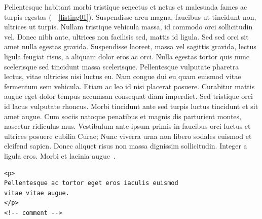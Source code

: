 Pellentesque habitant morbi tristique senectus et netus et malesuada fames ac turpis egestas (\seename\ \lstlistingname~\ref{listing01}). Suspendisse arcu magna, faucibus ut tincidunt non, ultrices ut turpis. Nullam tristique vehicula massa, id commodo orci sollicitudin vel. Donec nibh ante, ultrices non facilisis sed, mattis id ligula. Sed sed orci sit amet nulla egestas gravida. Suspendisse laoreet, massa vel sagittis gravida, lectus ligula feugiat risus, a aliquam dolor eros ac orci. Nulla egestas tortor quis nunc scelerisque sed tincidunt massa scelerisque. Pellentesque vulputate pharetra lectus, vitae ultricies nisi luctus eu. Nam congue dui eu quam euismod vitae fermentum sem vehicula. Etiam ac leo id nisi placerat posuere. Curabitur mattis augue eget dolor tempus accumsan consequat diam imperdiet. Sed tristique orci id lacus vulputate rhoncus. Morbi tincidunt ante sed turpis luctus tincidunt et sit amet augue. Cum sociis natoque penatibus et magnis dis parturient montes, nascetur ridiculus mus. Vestibulum ante ipsum primis in faucibus orci luctus et ultrices posuere cubilia Curae; Nunc viverra urna non libero sodales euismod et eleifend sapien. Donec aliquet risus non massa dignissim sollicitudin. Integer a ligula eros. Morbi et lacinia augue~\cite{bookname}.

\begin{lstlisting}[caption={caption text},label=listing01]
<p>
Pellentesque ac tortor eget eros iaculis euismod
vitae vitae augue.
</p>
<!-- comment -->
\end{lstlisting}